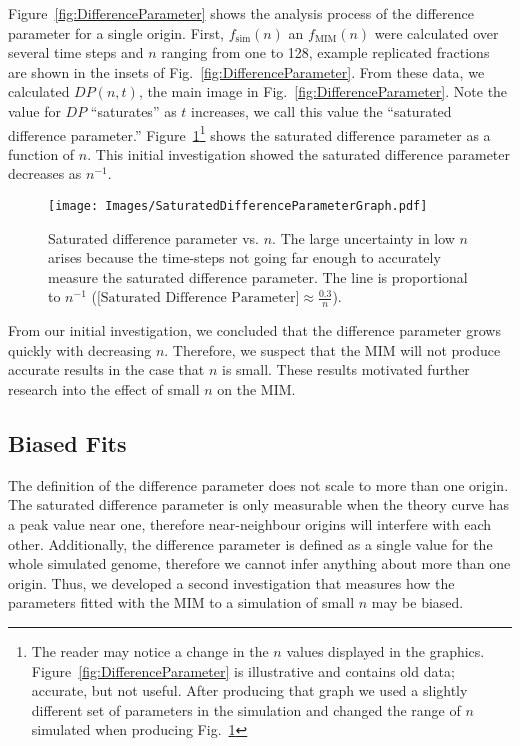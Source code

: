 		Figure~\ref{fig:DifferenceParameter} shows the analysis process of the difference parameter for a single origin.
		First, $f_\text{sim}(n)$ an $f_\text{MIM}(n)$ were calculated over several time steps and $n$ ranging from one to 128, example replicated fractions are shown in the insets of Fig.~\ref{fig:DifferenceParameter}.
		From these data, we calculated $DP(n,t)$, the main image in Fig.~\ref{fig:DifferenceParameter}.
		Note the value for $DP$ ``saturates'' as $t$ increases, we call this value the ``saturated difference parameter.''
		Figure~\ref{fig:SaturatedDifferenceParameter}\footnote{
		The reader may notice a change in the $n$ values displayed in the graphics. Figure~\ref{fig:DifferenceParameter} is illustrative and contains old data; accurate, but not useful.
		After producing that graph we used a slightly different set of parameters in the simulation and changed the range of $n$ simulated when producing Fig.~\ref{fig:SaturatedDifferenceParameter}}
		shows the saturated difference parameter as a function of $n$.
		This initial investigation showed the saturated difference parameter decreases as $n^{-1}$.
		
		\begin{figure}[tbh]
			\begin{center}
				\texttt{[image: Images/SaturatedDifferenceParameterGraph.pdf]}
			\end{center}
				\caption[Saturated Difference Parameter]{\label{fig:SaturatedDifferenceParameter} Saturated difference parameter vs. $n$.
				The large uncertainty in low $n$ arises because the time-steps not going far enough to accurately measure the saturated difference parameter.
				The line is proportional to $n^{-1}$ ($\text{[Saturated Difference Parameter]} \approx \frac{0.3}{n}$).
				}
		\end{figure}
		
		From our initial investigation, we concluded that the difference parameter grows quickly with decreasing $n$.
		Therefore, we suspect that the MIM will not produce accurate results in the case that $n$ is small.
		These results motivated further research into the effect of small $n$ on the MIM.
		
		
		\subsection{Biased Fits}
		\label{subsec:BiasedFits}
		
		The definition of the difference parameter does not scale to more than one origin.
		The saturated difference parameter is only measurable when the theory curve has a peak value near one, therefore near-neighbour origins will interfere with each other.
		Additionally, the difference parameter is defined as a single value for the whole simulated genome, therefore we cannot infer anything about more than one origin.
		Thus, we developed a second investigation that measures how the parameters fitted with the MIM to a simulation of small $n$ may be biased.
		
